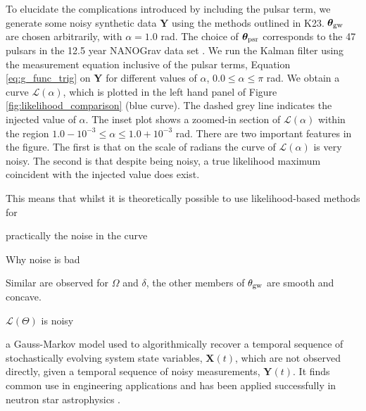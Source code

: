 \documentclass[fleqn,usenatbib,useAMS]{mnras}
\begin{document}
To elucidate the complications introduced by including the pulsar term, we generate some noisy synthetic data $\boldsymbol{Y}$ using the methods outlined in K23. $\boldsymbol{\theta}_{\rm gw}$ are chosen arbitrarily, with $\alpha = 1.0 $ rad.
The choice of $\boldsymbol{\theta}_{\rm psr}$ corresponds to the 47 pulsars in the 12.5 year NANOGrav data set  \citep{2020ApJ...905L..34A}. We run the Kalman filter using the measurement equation inclusive of the pulsar terms, Equation \eqref{eq:g_func_trig} on $\boldsymbol{Y}$ for different values of $\alpha$, $ 0.0 \le \alpha \le \pi$ rad. We obtain a curve $\mathcal{L}(\alpha)$, which is plotted in the left hand panel of Figure \ref{fig:likelihood_comparison} (blue curve). The dashed grey line indicates the injected value of $\alpha$. The inset plot shows a zoomed-in section of $\mathcal{L}(\alpha)$ within the region $ 1.0 - 10^{-3} \le \alpha \le 1.0 +10^{-3}$ rad. There are two important features in the figure. The first is that on the scale of radians the curve of $\mathcal{L}(\alpha)$ is very noisy. The second is that despite being noisy, a true likelihood maximum coincident with the injected value does exist. 





This means that whilst it is theoretically possible to use likelihood-based methods for 

practically the noise in the curve

Why noise is bad


Similar are observed for $\Omega$ and $\delta$, the other members of $\theta_{\rm gw}$ are smooth and concave.

$\mathcal{L}(\Theta)$ is noisy 




















a Gauss-Markov model used to algorithmically recover a temporal sequence of stochastically evolving  system state variables, $\boldsymbol{X}(t)$, which are not observed directly, given a temporal sequence of noisy measurements, $\boldsymbol{Y}(t)$. It finds common use in engineering applications and has been applied successfully in neutron star astrophysics \citep[e.g.][]{Myers2021MNRAS.502.3113M,Meyers2021,Melatos2023}.
\end{document}
